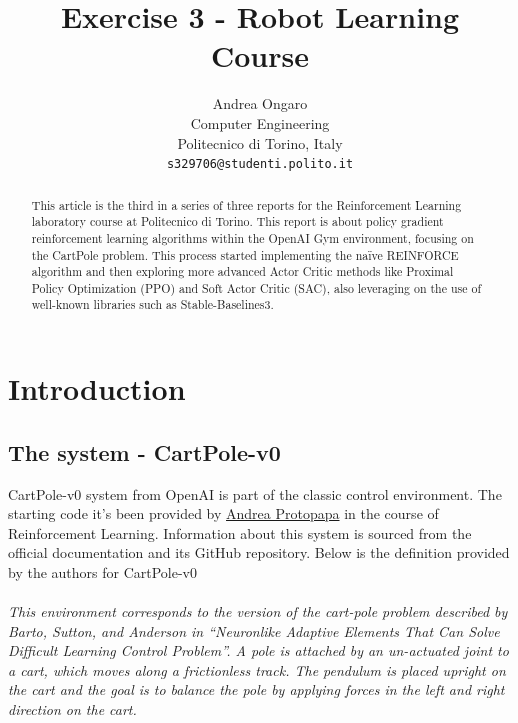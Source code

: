 \documentclass{article}
\title{Exercise 3 - Robot Learning Course}
\author{
  Andrea Ongaro\\
	Computer Engineering\\
	Politecnico di Torino, Italy\\
	\texttt{s329706@studenti.polito.it} \\
}
\begin{document}
\maketitle


\begin{abstract}
This article is the third in a series of three reports for the Reinforcement Learning laboratory course at Politecnico di Torino. This report is about policy gradient reinforcement learning algorithms within the OpenAI Gym environment, focusing on the CartPole problem. This process started implementing the naïve REINFORCE algorithm and then exploring more advanced Actor Critic methods like Proximal Policy Optimization (PPO) and Soft Actor Critic (SAC), also leveraging on the use of well-known
libraries such as Stable-Baselines3.

\end{abstract}



\section{Introduction}
\subsection{The system - CartPole-v0}
CartPole-v0 system from OpenAI is part of the classic control environment. The starting code it's been provided by \href{https://www.polito.it/personale?p=andrea.protopapa}{Andrea Protopapa} in the course of Reinforcement Learning. Information about this system is sourced from the official documentation \cite{Cart_pole} and its GitHub repository. Below is the definition provided by the authors for CartPole-v0\\ \\
\textit{This environment corresponds to the version of the cart-pole problem described by Barto, Sutton, and Anderson in “Neuronlike Adaptive Elements That Can Solve Difficult Learning Control Problem”. A pole is attached by an un-actuated joint to a cart, which moves along a frictionless track. The pendulum is placed upright on the cart and the goal is to balance the pole by applying forces in the left and right direction on the cart.\citep{Cart_pole}}
\end{document}
